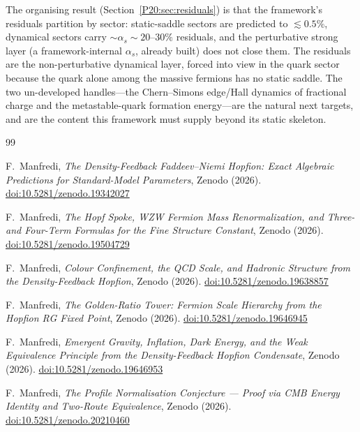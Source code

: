 \documentclass[11pt,a4paper]{article}
\theoremstyle{definition}\newtheorem{definition}[theorem]{Definition}
\theoremstyle{remark}
\newcommand{\alphas}{\alpha_s}
\begin{document}
The organising result (Section~\ref{P20:sec:residuals}) is that the
framework's residuals partition by sector: static-saddle sectors are
predicted to $\lesssim0.5\%$, dynamical sectors carry
$\sim\!\alphas\sim20$--$30\%$ residuals, and the perturbative strong
layer (a framework-internal $\alphas$, already built) does not close
them. The residuals are the non-perturbative dynamical layer, forced
into view in the quark sector because the quark alone among the massive
fermions has no static saddle. The two un-developed handles---the
Chern--Simons edge/Hall dynamics of fractional charge and the
metastable-quark formation energy---are the natural next targets, and
are the content this framework must supply beyond its static skeleton.

\begin{thebibliography}{99}

F.~Manfredi,
\textit{The Density-Feedback Faddeev--Niemi Hopfion:
  Exact Algebraic Predictions for Standard-Model Parameters},
Zenodo (2026).
\href{https://doi.org/10.5281/zenodo.19342027}{doi:10.5281/zenodo.19342027}

F.~Manfredi,
\textit{The Hopf Spoke, WZW Fermion Mass Renormalization,
  and Three- and Four-Term Formulas for the Fine Structure Constant},
Zenodo (2026).
\href{https://doi.org/10.5281/zenodo.19504729}{doi:10.5281/zenodo.19504729}

F.~Manfredi,
\textit{Colour Confinement, the QCD Scale, and Hadronic Structure
  from the Density-Feedback Hopfion},
Zenodo (2026).
\href{https://doi.org/10.5281/zenodo.19638857}{doi:10.5281/zenodo.19638857}

F.~Manfredi,
\textit{The Golden-Ratio Tower: Fermion Scale Hierarchy from the
  Hopfion RG Fixed Point},
Zenodo (2026).
\href{https://doi.org/10.5281/zenodo.19646945}{doi:10.5281/zenodo.19646945}

F.~Manfredi,
\textit{Emergent Gravity, Inflation, Dark Energy, and the Weak
  Equivalence Principle from the Density-Feedback Hopfion Condensate},
Zenodo (2026).
\href{https://doi.org/10.5281/zenodo.19646953}{doi:10.5281/zenodo.19646953}

F.~Manfredi,
\textit{The Profile Normalisation Conjecture ---
  Proof via CMB Energy Identity and Two-Route Equivalence},
Zenodo (2026).
\href{https://doi.org/10.5281/zenodo.20210460}{doi:10.5281/zenodo.20210460}


\end{thebibliography}
\end{document}
